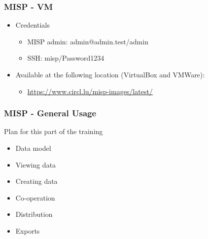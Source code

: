 


\begin{frame}[t,plain]
\titlepage
\end{frame}

\begin{frame}
    \frametitle{MISP - VM}
    \begin{itemize}
    \item Credentials
        \begin{itemize}
            \item MISP admin: admin@admin.test/admin
            \item SSH: misp/Password1234
        \end{itemize}
    \item Available at the following location (VirtualBox and VMWare):
        \begin{itemize}
                \item \url{https://www.circl.lu/misp-images/latest/}
        \end{itemize}
    \end{itemize}
\end{frame}

\begin{frame}
    \frametitle{MISP - General Usage}
    Plan for this part of the training
        \begin{itemize}
            \item Data model
            \item Viewing data
            \item Creating data
            \item Co-operation
            \item Distribution
            \item Exports
        \end{itemize}
\end{frame}

